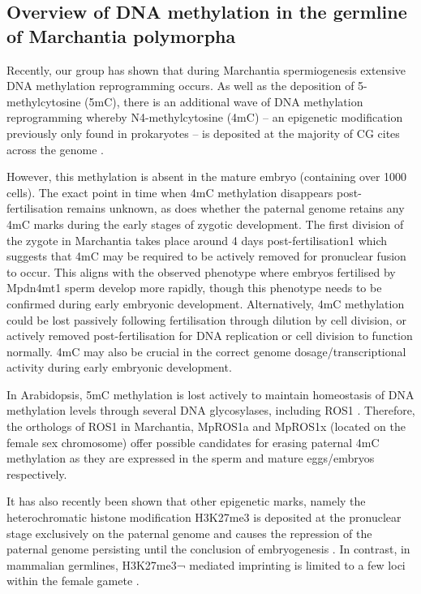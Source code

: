 \subsection{Overview of DNA methylation in the germline of Marchantia polymorpha}

Recently, our group has shown that during Marchantia spermiogenesis extensive DNA methylation reprogramming occurs. As well as the deposition of 5-methylcytosine (5mC), there is an additional wave of DNA methylation reprogramming whereby N4-methylcytosine (4mC) – an epigenetic modification previously only found in prokaryotes – is deposited at the majority of CG cites across the genome \citep{RN189}.

However, this methylation is absent in the mature embryo (containing over 1000 cells). The exact point in time when 4mC methylation disappears post-fertilisation remains unknown, as does whether the paternal genome retains any 4mC marks during the early stages of zygotic development. The first division of the zygote in Marchantia takes place around 4 days post-fertilisation1 which suggests that 4mC may be required to be actively removed for pronuclear fusion to occur. This aligns with the observed phenotype where embryos fertilised by Mpdn4mt1 sperm develop more rapidly, though this phenotype needs to be confirmed during early embryonic development. Alternatively, 4mC methylation could be lost passively following fertilisation through dilution by cell division, or actively removed post-fertilisation for DNA replication or cell division to function normally. 4mC may also be crucial in the correct genome dosage/transcriptional activity during early embryonic development. 

In Arabidopsis, 5mC methylation is lost actively to maintain homeostasis of DNA methylation levels through several DNA glycosylases, including ROS1 \citep{RN168}. Therefore, the orthologs of ROS1 in Marchantia, MpROS1a and MpROS1x (located on the female sex chromosome) offer possible candidates for erasing paternal 4mC methylation as they are expressed in the sperm \citep{RN212} and mature eggs/embryos \citep{RN257} respectively.

It has also recently been shown that other epigenetic marks, namely the heterochromatic histone modification H3K27me3 is deposited at the pronuclear stage exclusively on the paternal genome and causes the repression of the paternal genome persisting until the conclusion of embryogenesis \citep{RN160}. In contrast, in mammalian germlines, H3K27me3¬ mediated imprinting is limited to a few loci within the female gamete \citep{RN172}.

